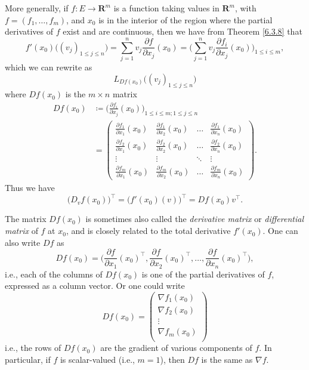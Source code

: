 \begin{additional corollary}\label{ac 6.3.4}
More generally, if \(f : E \to \mathbf{R}^m\) is a function taking values in \(\mathbf{R}^m\), with \(f = (f_1, \dots, f_m)\), and \(x_0\) is in the interior of the region where the partial derivatives of \(f\) exist and are continuous, then we have from Theorem \ref{6.3.8} that
\[
    f'(x_0)\big((v_j)_{1 \leq j \leq n}\big) = \sum_{j = 1}^n v_j \frac{\partial f}{\partial x_j}(x_0) = \bigg(\sum_{j = 1}^n v_j \frac{\partial f_i}{\partial x_j}(x_0)\bigg)_{1 \leq i \leq m},
\]
which we can rewrite as
\[
    L_{D f(x_0)}\big((v_j)_{1 \leq j \leq n}\big)
\]
where \(D f(x_0)\) is the \(m \times n\) matrix
\begin{align*}
    D f(x_0) & \coloneqq \bigg(\frac{\partial f_i}{\partial x_j}(x_0)\bigg)_{1 \leq i \leq m ; 1 \leq j \leq n} \\
             & = \begin{pmatrix}
        \frac{\partial f_1}{\partial x_1}(x_0) & \frac{\partial f_1}{\partial x_2}(x_0) & \dots  & \frac{\partial f_1}{\partial x_n}(x_0) \\
        \frac{\partial f_2}{\partial x_1}(x_0) & \frac{\partial f_2}{\partial x_2}(x_0) & \dots  & \frac{\partial f_2}{\partial x_n}(x_0) \\
        \vdots                                 & \vdots                                 & \ddots & \vdots                                 \\
        \frac{\partial f_m}{\partial x_1}(x_0) & \frac{\partial f_m}{\partial x_2}(x_0) & \dots  & \frac{\partial f_m}{\partial x_n}(x_0)
    \end{pmatrix}.
\end{align*}
Thus we have
\[
    \big(D_v f(x_0)\big)^\top = \big(f'(x_0)(v)\big)^\top = D f(x_0) v^\top.
\]

The matrix \(D f(x_0)\) is sometimes also called the \emph{derivative matrix} or \emph{differential matrix} of \(f\) at \(x_0\), and is closely related to the total derivative \(f'(x_0)\).
One can also write \(Df\) as
\[
    D f(x_0) = \bigg(\frac{\partial f}{\partial x_1}(x_0)^\top, \frac{\partial f}{\partial x_2}(x_0)^\top, \dots, \frac{\partial f}{\partial x_n}(x_0)^\top\bigg),
\]
i.e., each of the columns of \(D f(x_0)\) is one of the partial derivatives of \(f\), expressed as a column vector.
Or one could write
\[
    D f(x_0) = \begin{pmatrix}
        \nabla f_1(x_0) \\
        \nabla f_2(x_0) \\
        \vdots          \\
        \nabla f_m(x_0) \\
    \end{pmatrix}
\]
i.e., the rows of \(D f(x_0)\) are the gradient of various components of \(f\).
In particular, if \(f\) is scalar-valued (i.e., \(m = 1\)), then \(Df\) is the same as \(\nabla f\).
\end{additional corollary}

